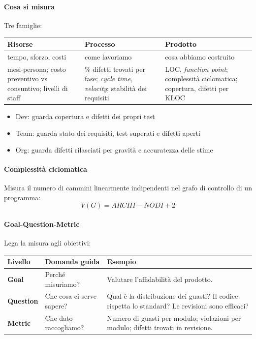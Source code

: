 \documentclass[12pt]{extarticle}
\begin{document}
\paragraph{Cosa si misura} Tre famiglie:
\begin{center}
\small
\begin{tabular}{p{5.2cm}p{5.2cm}p{5.2cm}}
    \toprule
    \textbf{Risorse} & \textbf{Processo} & \textbf{Prodotto} \\
    \midrule
    tempo, sforzo, costi & come lavoriamo & cosa abbiamo costruito \\
    \addlinespace
    mesi-persona; costo preventivo vs consuntivo; livelli di staff & \% difetti trovati per fase; \textit{cycle time}, \textit{velocity}; stabilità dei requisiti & LOC, \textit{function point}; complessità ciclomatica; copertura, difetti per KLOC \\
    \bottomrule
\end{tabular}
\end{center}

\begin{itemize}
    \item Dev: guarda copertura e difetti dei propri test
    \item Team: guarda stato dei requisiti, test superati e difetti aperti
    \item Org: guarda difetti rilasciati per gravità e accuratezza delle stime
\end{itemize}

\paragraph{Complessità ciclomatica} Misura il numero di cammini linearmente indipendenti nel grafo di controllo di un programma:
\[
V(G) = ARCHI-NODI+2
\]

\paragraph{Goal-Question-Metric} Lega la misura agli obiettivi:
\begin{center}
\small
\begin{tabular}{p{2.4cm}p{5.4cm}p{8.0cm}}
    \toprule
    \textbf{Livello} & \textbf{Domanda guida} & \textbf{Esempio} \\
    \midrule
    \textbf{Goal} & Perché misuriamo? & Valutare l'affidabilità del prodotto. \\
    \addlinespace
    \textbf{Question} & Che cosa ci serve sapere? & Qual è la distribuzione dei guasti? Il codice rispetta lo standard? Le revisioni sono efficaci? \\
    \addlinespace
    \textbf{Metric} & Che dato raccogliamo? & Numero di guasti per modulo; violazioni per modulo; difetti trovati in revisione. \\
    \bottomrule
\end{tabular}
\end{center}
\end{document}
